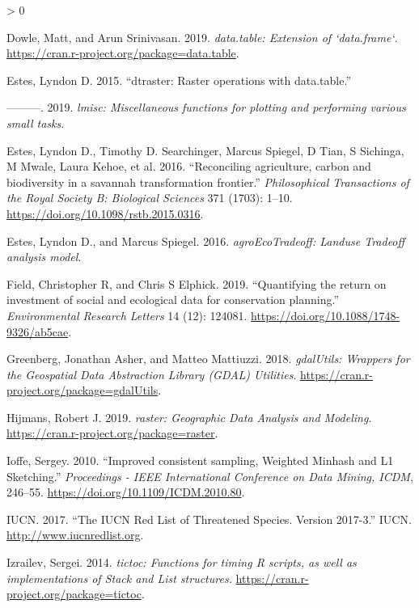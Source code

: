 \documentclass[
]{article}
\newlength{\cslhangindent}
\newenvironment{CSLReferences}[2] %
 {%
  \setlength{\parindent}{0pt}
  \ifodd #1 \everypar{\setlength{\hangindent}{\cslhangindent}}\ignorespaces\fi
  \ifnum #2 > 0
  \setlength{\parskip}{#2\baselineskip}
  \fi
 }%
 {}
\begin{document}
\begin{CSLReferences}{1}{0}
\leavevmode\hypertarget{ref-R-data.table}{}%
Dowle, Matt, and Arun Srinivasan. 2019. \emph{{data.table: Extension of `data.frame`}}. \url{https://cran.r-project.org/package=data.table}.

\leavevmode\hypertarget{ref-Estes2015}{}%
Estes, Lyndon D. 2015. {``{dtraster: Raster operations with data.table}.''}

\leavevmode\hypertarget{ref-R-lmisc}{}%
---------. 2019. \emph{{lmisc: Miscellaneous functions for plotting and performing various small tasks}}.

\leavevmode\hypertarget{ref-Estes2016a}{}%
Estes, Lyndon D., Timothy D. Searchinger, Marcus Spiegel, D Tian, S Sichinga, M Mwale, Laura Kehoe, et al. 2016. {``{Reconciling agriculture, carbon and biodiversity in a savannah transformation frontier}.''} \emph{Philosophical Transactions of the Royal Society B: Biological Sciences} 371 (1703): 1--10. \url{https://doi.org/10.1098/rstb.2015.0316}.

\leavevmode\hypertarget{ref-R-agroEcoTradeoff}{}%
Estes, Lyndon D., and Marcus Spiegel. 2016. \emph{{agroEcoTradeoff: Landuse Tradeoff analysis model}}.

\leavevmode\hypertarget{ref-Field2019}{}%
Field, Christopher R, and Chris S Elphick. 2019. {``{Quantifying the return on investment of social and ecological data for conservation planning}.''} \emph{Environmental Research Letters} 14 (12): 124081. \url{https://doi.org/10.1088/1748-9326/ab5cae}.

\leavevmode\hypertarget{ref-R-gdalUtils}{}%
Greenberg, Jonathan Asher, and Matteo Mattiuzzi. 2018. \emph{{gdalUtils: Wrappers for the Geospatial Data Abstraction Library (GDAL) Utilities}}. \url{https://cran.r-project.org/package=gdalUtils}.

\leavevmode\hypertarget{ref-R-raster}{}%
Hijmans, Robert J. 2019. \emph{{raster: Geographic Data Analysis and Modeling}}. \url{https://cran.r-project.org/package=raster}.

\leavevmode\hypertarget{ref-Ioffe2010}{}%
Ioffe, Sergey. 2010. {``{Improved consistent sampling, Weighted Minhash and L1 Sketching}.''} \emph{Proceedings - IEEE International Conference on Data Mining, ICDM}, 246--55. \url{https://doi.org/10.1109/ICDM.2010.80}.

\leavevmode\hypertarget{ref-IUCN2017}{}%
IUCN. 2017. {``{The IUCN Red List of Threatened Species. Version 2017-3}.''} IUCN. \url{http://www.iucnredlist.org}.

\leavevmode\hypertarget{ref-R-tictoc}{}%
Izrailev, Sergei. 2014. \emph{{tictoc: Functions for timing R scripts, as well as implementations of Stack and List structures.}} \url{https://cran.r-project.org/package=tictoc}.


\end{CSLReferences}
\end{document}
